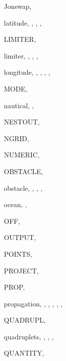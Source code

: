 \documentclass[12pt]{book}
\begin{document}
\begin{theindex}
  \indexspace

  \item Jonswap, 

  \indexspace

  \item latitude, , , , 
  \item LIMITER, 
  \item limiter, , , , 
  \item longitude, , , , 
		, 

  \indexspace

  \item MODE, 

  \indexspace

  \item nautical, , 
  \item NESTOUT, 
  \item NGRID, 
  \item NUMERIC, 

  \indexspace

  \item OBSTACLE, 
  \item obstacle, , , , 
  \item ocean, , 
  \item OFF, 
  \item OUTPUT, 

  \indexspace

  \item POINTS, 
  \item PROJECT, 
  \item PROP, 
  \item propagation, , , , 
		, , 

  \indexspace

  \item QUADRUPL, 
  \item quadruplets, , , , 
  \item QUANTITY, 


\end{theindex}
\end{document}
